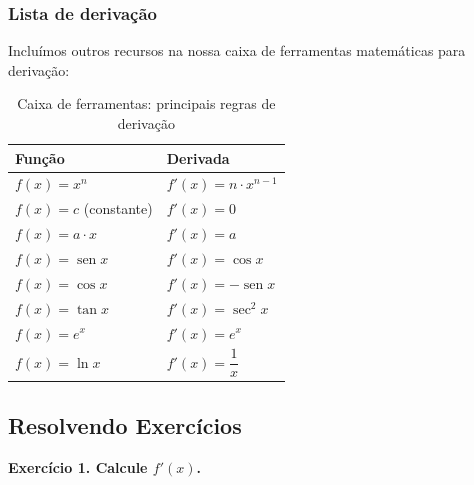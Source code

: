 \documentclass[12pt,openright,twoside,a4paper]{article}
\theoremstyle{definition}
\renewcommand{\sin}{\operatorname{sen}} %
\begin{document}
	\subsubsection{Lista de derivação}
	
	Incluímos outros recursos na nossa caixa de ferramentas matemáticas para derivação:
		\renewcommand{\arraystretch}{1.5}
		
		\begin{table}[h!]
			\centering
			\caption{Caixa de ferramentas: principais regras de derivação}
			\begin{tabular}{|>{\centering\arraybackslash}m{5cm}|>{\centering\arraybackslash}m{8cm}|}
				\hline
				\textbf{Função} & \textbf{Derivada} \\
				\hline
				$\displaystyle f(x) = x^n$ & $\displaystyle f'(x) = n \cdot x^{n-1}$ \\
				\hline
				$\displaystyle f(x) = c$ (constante) & $\displaystyle f'(x) = 0$ \\
				\hline
				$\displaystyle f(x) = a \cdot x$ & $\displaystyle f'(x) = a$ \\
				\hline
				$\displaystyle f(x) = \sin x$ & $\displaystyle f'(x) = \cos x$ \\
				\hline
				$\displaystyle f(x) = \cos x$ & $\displaystyle f'(x) = -\sin x$ \\
				\hline
				$\displaystyle f(x) = \tan x$ & $\displaystyle f'(x) = \sec^2 x$ \\
				\hline
				$\displaystyle f(x) = e^x$ & $\displaystyle f'(x) = e^x$ \\
				\hline
				$\displaystyle f(x) = \ln x$ & $\displaystyle f'(x) = \dfrac{1}{x}$ \\
				\hline
			\end{tabular}
			\label{tab:regras_derivacao}
		\end{table}
	\renewcommand{\arraystretch}{1.0}
		
	
	\subsection{Resolvendo Exercícios}
	
	\textbf{Exercício 1. Calcule \(f'(x)\).}
	
\end{document}
